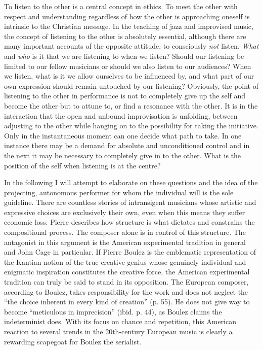 \documentclass[a4paper]{article}
\begin{document}
To listen to the other is a central concept in ethics. To meet the other with respect and understanding regardless of how the other is approaching oneself is intrinsic to the Christian message. In the teaching of jazz and improvised music, the concept of listening to the other is absolutely essential, although there are many important accounts of the opposite attitude, to consciously \emph{not} listen. \emph{What} and \emph{who} is it that we are listening to when we listen? Should our listening be limited to our fellow musicians or should we also listen to our audiences? When we listen, what is it we allow ourselves to be influenced by, and what part of our own expression should remain untouched by our listening? Obviously, the point of listening to the other in performance is not to completely give up the self and become the other but to attune to, or find a resonance with the other. It is in the interaction that the open and unbound improvisation is unfolding, between adjusting to the other while hanging on to the possibility for taking the initiative. Only in the instantaneous moment can one decide what path to take. In one instance there may be a demand for absolute and unconditioned control and in the next it may be necessary to completely give in to the other. What is the position of the self when listening is at the centre?

In the following I will attempt to elaborate on these questions and the idea of the projecting, autonomous performer for whom the individual will is the sole guideline. There are countless stories of intransigent musicians whose artistic and expressive choices are exclusively their own, even when this means they suffer economic loss. Pierre \citet{boulez64} describes how structure is what dictates and constrains the compositional process. The composer alone is in control of this structure. The antagonist in this argument is the American experimental tradition in general and John Cage in particular. If Pierre Boulez is the emblematic representation of the Kantian notion of the true creative genius whose genuinely individual and enigmatic inspiration constitutes the creative force, the American experimental tradition can truly be said to stand in its opposition. The European composer, according to Boulez, takes responsibility for the work and does not neglect the ``the choice inherent in every kind of creation'' (p. 55). He does not give way to become ``meticulous in imprecision'' (ibid. p. 44), as Boulez claims the indeterminist does. With its focus on chance and repetition, this American reaction to several trends in the 20th-century European music is clearly a rewarding scapegoat for Boulez the serialist. 
\end{document}
